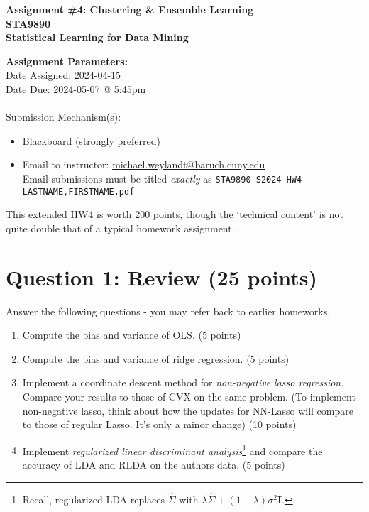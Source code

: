 \documentclass[10pt]{article}
\begin{document}
\begin{center}
    {\Large \bf Assignment \#4: Clustering \& Ensemble Learning \\ STA9890 \\ Statistical Learning for Data Mining}
\end{center}

{\bf Assignment Parameters:} \\
\phantom{abc}Date Assigned: 2024-04-15\\
\phantom{abc}Date Due: 2024-05-07 @ 5:45pm \\
~\\
\phantom{abc}Submission Mechanism(s):
\begin{itemize}
    \item Blackboard (strongly preferred)
    \item Email to instructor: \href{mailto:michael.weylandt@baruch.cuny.edu}{michael.weylandt@baruch.cuny.edu} \\ 
    {\small Email submissions must be titled \emph{exactly} as \texttt{STA9890-S2024-HW4-LASTNAME,FIRSTNAME.pdf}}
\end{itemize}

This extended HW4 is worth 200 points, though the `technical content' is not quite double that of a typical homework assignment. 

\section*{Question 1: Review (25 points)}
Answer the following questions - you may refer back to earlier homeworks. 

\begin{enumerate}
    \item Compute the bias and variance of OLS. (5 points)
    \item Compute the bias and variance of ridge regression.  (5 points)
    \item Implement a coordinate descent method for \emph{non-negative lasso regression}. Compare your results to those of CVX on the same problem. (To implement non-negative lasso, think about how the updates for NN-Lasso will compare to those of regular Lasso. It's only a minor change) (10 points)
    \item Implement \emph{regularized linear discriminant analysis}\footnote{Recall, regularized LDA replaces $\hat{\Sigma}$ with $\lambda \hat{\Sigma} + (1-\lambda)\sigma^2 \mathbf{I}$.} and compare the accuracy of LDA and RLDA on the \textsf{authors} data. (5 points) 
\end{enumerate}
\end{document}

